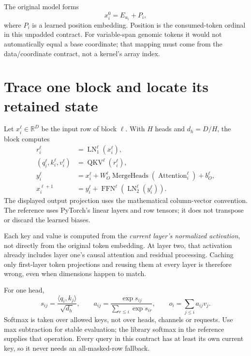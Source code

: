 The original model forms
\[
 x_i^0=E_{u_i}+P_i,
\]
where $P_i$ is a learned position embedding. Position is the consumed-token
ordinal in this unpadded contract. For variable-span genomic tokens it would
not automatically equal a base coordinate; that mapping must come from the
data/coordinate contract, not a kernel's array index.

\section{Trace one block and locate its retained state}
\label{evod35:block}
Let $x^\ell_i\in\mathbb R^D$ be the input row of block $\ell$. With $H$
heads and $d_h=D/H$, the block computes
\begin{align*}
 r^\ell_i&=\operatorname{LN}_1^\ell(x^\ell_i),\\
 (q^\ell_i,k^\ell_i,v^\ell_i)&=
       \operatorname{QKV}^\ell(r^\ell_i),\\
 y^\ell_i&=x^\ell_i+
       W_O^\ell\operatorname{MergeHeads}(\operatorname{Attention}_i^\ell)
       +b_O^\ell,\\
 x^{\ell+1}_i&=y^\ell_i+
       \operatorname{FFN}^\ell(\operatorname{LN}_2^\ell(y^\ell_i)).
\end{align*}
The displayed output projection uses the mathematical column-vector
convention. The reference uses PyTorch's linear layers and row tensors;
it does not transpose or discard the learned biases.

Each key and value is computed from the \emph{current layer's normalized
activation}, not directly from the original token embedding. At layer two,
that activation already includes layer one's causal attention and residual
processing. Caching only first-layer token projections and reusing them at
every layer is therefore wrong, even when dimensions happen to match.


For one head,
\[
 s_{ij}=\frac{\langle q_i,k_j\rangle}{\sqrt{d_h}},
 \qquad
 a_{ij}=\frac{\exp s_{ij}}{\sum_{r\le i}\exp s_{ir}},
 \qquad o_i=\sum_{j\le i}a_{ij}v_j.
\]
Softmax is taken over allowed keys, not over heads, channels or requests.
Use max subtraction for stable evaluation; the library softmax in the
reference supplies that operation. Every query in this contract has at least
its own current key, so it never needs an all-masked-row fallback.

